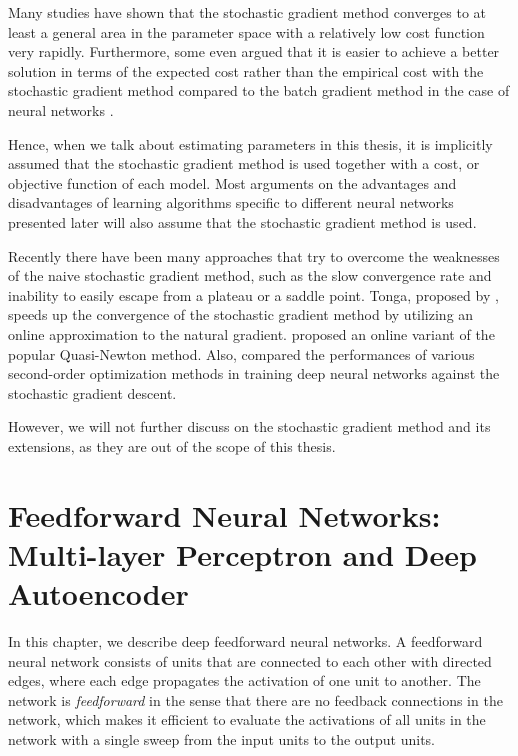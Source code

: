 \documentclass[dissertation,nocontribution,draft*]{aaltoseries}
\begin{document}
Many studies \citep[see, e.g.,][and references
therein]{Bottou2008,Bottou2004} have shown that the stochastic
gradient method converges to at least a general area in
the parameter space with a relatively low cost function very
rapidly. Furthermore, some even argued that it is easier to
achieve a better solution in terms of the expected cost
rather than the empirical cost with the stochastic gradient
method compared to the batch gradient method in the case of
neural networks \citep{Lecun1998a}.

Hence, when we talk about estimating
parameters in this thesis, it is implicitly assumed that the stochastic
gradient method is used together with a cost, or objective
function of each model. Most arguments on the advantages and
disadvantages of learning algorithms specific to different
neural networks presented later will also assume that the
stochastic gradient method is used.

Recently there have been many approaches that try to
overcome the weaknesses of the naive stochastic gradient
method, such as the slow convergence rate and inability to
easily escape from a plateau or a saddle point.  Tonga,
proposed by \citet{Roux2008a}, speeds up the convergence of
the stochastic gradient method by utilizing an online
approximation to the natural gradient.
\citet{Schraudolph2007} proposed an online variant of the
popular Quasi-Newton method.
Also, \citet{Le2011} compared the performances of various
second-order optimization methods in training deep neural
networks against the stochastic gradient descent.

However, we will not further discuss on the stochastic
gradient method and its extensions, as they are out of the
scope of this thesis.




\chapter{Feedforward Neural Networks: \\{\small Multi-layer
Perceptron and Deep Autoencoder}}
\label{chap:ffnn}

In this chapter, we describe deep feedforward neural
networks. A feedforward neural network consists of units
that are connected to each other with directed edges, where
each edge propagates the activation of one unit to another.
The network is \textit{feedforward} in the sense that there
are no feedback connections in the network, which makes it
efficient to evaluate the activations of all units in the
network with a single sweep from the input units to the
output units.
\end{document}
